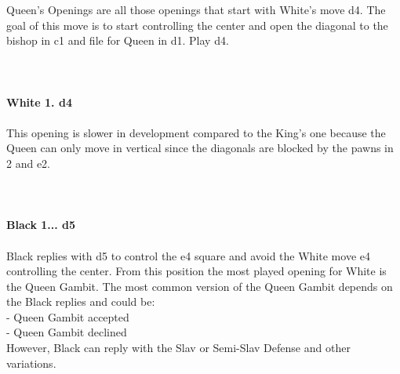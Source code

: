 \documentclass{article}
\begin{document}
Queen's Openings are all those openings that start with White's move d4. The goal of this move is to start controlling the center and open the diagonal to the bishop in c1 and file for Queen in d1. Play d4.\\
\\

\\
\\
\textbf{White 1. d4}\\
\\
This opening is slower in development compared to the King's one because the Queen can only move in vertical since the diagonals are blocked by the pawns in 2 and e2.\\
\\

\\
\\
\textbf{Black 1... d5}\\
\\
Black replies with d5 to control the e4 square and avoid the White move e4 controlling the center. From this position the most played opening for White is the Queen Gambit. The most common version of the Queen Gambit depends on the Black replies and could be:\\- Queen Gambit accepted\\- Queen Gambit declined\\However, Black can reply with the Slav or Semi-Slav Defense and other variations.\\
\\
\end{document}
